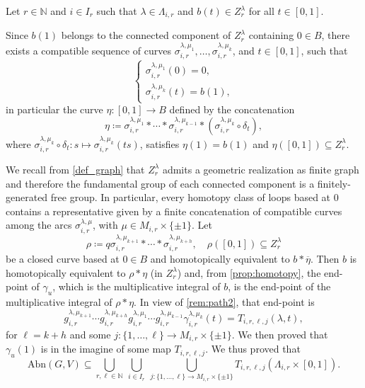 \documentclass[a4paper,11pt,reqno]{amsart}
\theoremstyle{plain}
\theoremstyle{definition}
\newcommand{\N}{\mathbb N}
\newcommand{\abn}{\mathrm{Abn}}
\begin{document}
Let $r \in \N$ and $i \in I_r$ such that $\lambda \in \Lambda_{i,r}$ and $b(t) \in Z^\lambda_r$ for all $t\in [0,1]$.

    Since $b(1)$ belongs to the connected component of $Z^\lambda_r$
 containing $0 \in B$, there exists a compatible sequence of curves $\sigma^{\lambda,\mu_1}_{i,r},\dots, \sigma^{\lambda,\mu_k}_{i,r}$, and $t \in [0,1]$, such that 
 \begin{equation*}
 \begin{cases}
     \sigma^{\lambda,\mu_1}_{i,r}(0)=0, \\ 
     \sigma^{\lambda,\mu_k}_{i,r}(t)=b(1),
 \end{cases}
 \end{equation*}
 in particular the curve $\eta : [0,1]\to B$ defined by the concatenation 
 \[
\eta \coloneq  \sigma^{\lambda,\mu_1}_{i,r} * \cdots * \sigma^{\lambda,\mu_{k-1}}_{i,r} * (\sigma^{\lambda,\mu_k}_{i,r} \circ \delta_t),
 \]
 where $\sigma^{\lambda,\mu_k}_{i,r} \circ \delta_t \colon s \mapsto \sigma^{\lambda,\mu_k}_{i,r}(ts)$, satisfies $\eta(1)=b(1)$ and $\eta ([0,1]) \subseteq  Z^\lambda_r$.
 
 We recall from \cref{def_graph} that $Z^\lambda_r$ admits a geometric realization as finite graph and therefore the fundamental group of each connected component is a finitely-generated free group. In particular, every homotopy class of loops based at $0$ contains a representative given by a finite concatenation of compatible curves among the arcs $\sigma^{\lambda,\mu}_{i,r}$, with $\mu\in M_{i,r} \times \{\pm1\}$. Let
\begin{equation*}
\rho \coloneq q  \sigma^{\lambda,\mu_{k+1}}_{i,r} * \cdots * \sigma^{\lambda,\mu_{k+h}}_{i,r},  \quad \rho([0,1])\subseteq Z^\lambda_r
\end{equation*}
be a closed curve based at $0 \in B$ and homotopically equivalent to $b * \overline{\eta}$. 
Then $b$ is homotopically equivalent to $\rho*\eta$ (in $Z^\lambda_r$) and, from \cref{prop:homotopy}, the end-point of $\gamma_u$, which is the multiplicative integral of $b$, is the end-point of the multiplicative integral of $\rho*\eta$. In view of \cref{rem:path2}, that end-point is
 \begin{equation*}
     g^{\lambda,\mu_{k+1}}_{i,r} \cdots g^{\lambda,\mu_{k+h}}_{i,r} g^{\lambda,\mu_1}_{i,r} \cdots g^{\lambda,\mu_{k-1}}_{i,r}  \gamma^{\lambda,\mu_k}_{i,r}(t) = T_{i,r,\ell,j}(\lambda,t),
 \end{equation*}
 for $\ell = k+h$ and some $j \colon \{1,\dots,\ell\} \to M_{i,r} \times \{\pm1\}$. We then proved that $\gamma_u(1)$ is in the imagine of some map $T_{i,r,\ell,j}$. We thus proved that
\[
\abn(G,V)\subseteq \bigcup_{r,\ell\in\N}\ \bigcup_{i\in I_r}\ \bigcup_{j:\{1,\dots,\ell\}\to M_{i,r} \times \{\pm1\}}
T_{i,r,\ell,j}(\Lambda_{i,r}\times[0,1]).
\]
\end{document}
